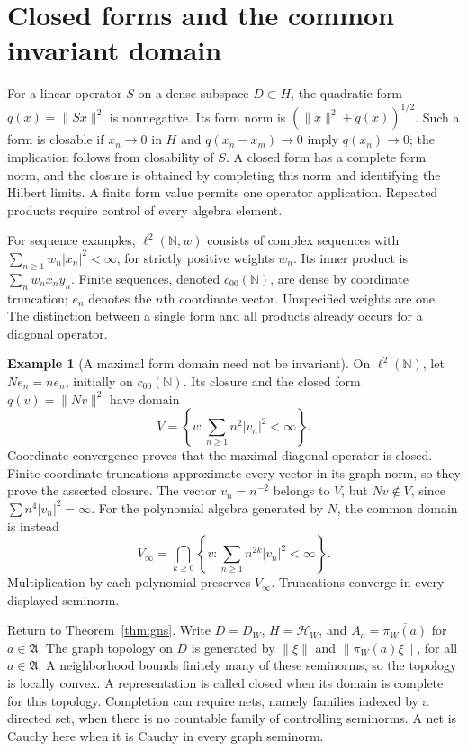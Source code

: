 \documentclass[11pt]{article}
\theoremstyle{definition}
\newtheorem{example}[theorem]{Example}
\theoremstyle{remark}
\numberwithin{equation}{section}
\begin{document}
\section{Closed forms and the common invariant domain}
\label{sec:graph-domain}

For a linear operator $S$ on a dense subspace $D\subset H$, the quadratic
form $q(x)=\|Sx\|^2$ is nonnegative.  Its form norm is
$(\|x\|^2+q(x))^{1/2}$.  Such a form is closable if $x_n\to0$ in $H$ and
$q(x_n-x_m)\to0$ imply $q(x_n)\to0$; the implication follows from
closability of $S$.  A closed form has a complete form norm, and the closure
is obtained by completing this norm and identifying the Hilbert limits.
A finite form value permits one operator application.  Repeated products
require control of every algebra element.

For sequence examples, $\ell^2(\mathbb N,w)$ consists of complex sequences
with $\sum_{n\geq1}w_n|x_n|^2<\infty$, for strictly positive weights $w_n$.
Its inner product is $\sum_n w_nx_n\bar y_n$.  Finite sequences, denoted
$c_{00}(\mathbb N)$, are dense by coordinate truncation; $e_n$ denotes the
$n$th coordinate vector.  Unspecified weights are one.
The distinction between a single form and all products already occurs for
a diagonal operator.

\begin{example}[A maximal form domain need not be invariant]
\label{ex:maximal-domain}
On $\ell^2(\mathbb N)$, let $Ne_n=ne_n$, initially on $c_{00}(\mathbb N)$.
Its closure and the closed form $q(v)=\|Nv\|^2$ have domain
\[
 V=\left\{v:\sum_{n\geq1}n^2|v_n|^2<\infty\right\}.
\]
Coordinate convergence proves that the maximal diagonal operator is closed.
Finite coordinate truncations approximate every vector in its graph norm,
so they prove the asserted closure.  The vector $v_n=n^{-2}$ belongs to $V$,
but $Nv\notin V$, since $\sum n^4|v_n|^2=\infty$.
For the polynomial algebra generated by $N$, the common domain is instead
\begin{equation}
 V_\infty=\bigcap_{k\geq0}
 \left\{v:\sum_{n\geq1}n^{2k}|v_n|^2<\infty\right\}.
 \label{eq:all-moments}
\end{equation}
Multiplication by each polynomial preserves $V_\infty$.
Truncations converge in every displayed seminorm.
\end{example}

Return to Theorem~\ref{thm:gns}.  Write $D=D_W$, $H=\mathcal H_W$,
and $A_a=\overline{\pi_W(a)}$ for $a\in\mathfrak A$.
The graph topology on $D$ is generated by $\|\xi\|$ and
$\|\pi_W(a)\xi\|$, for all $a\in\mathfrak A$.
A neighborhood bounds finitely many of these seminorms, so the topology
is locally convex.  A representation is called closed when its domain is
complete for this topology.  Completion can require nets, namely families
indexed by a directed set, when there is no countable family of controlling
seminorms.  A net is Cauchy here when it is Cauchy in every graph seminorm.
\end{document}
